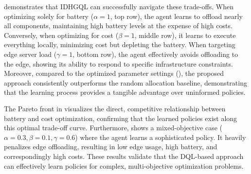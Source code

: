  demonstrates that IDHGQL can successfully navigate these trade-offs. 
When optimizing solely for battery ($\alpha=1$, top row), 
 the agent learns to offload nearly all components, 
 maintaining high battery levels at the expense of high costs. 
%
Conversely, 
 when optimizing for cost ($\beta=1$, middle row), 
 it learns to execute everything locally, minimizing cost but depleting the battery. 
%
When targeting edge server load ($\gamma=1$, bottom row), 
 the agent effectively avoids offloading to the edge, 
 showing its ability to respond to specific infrastructure constraints.
%
Moreover, 
 compared to the optimized parameter settings (), 
 the proposed approach consistently outperforms the random allocation baseline, 
 demonstrating that the learning process provides a tangible advantage over uninformed policies.


The Pareto front in  visualizes the direct, 
 competitive relationship between battery and cost optimization, 
 confirming that the learned policies exist along this optimal trade-off curve. 
% 
Furthermore,  
 shows a mixed-objective case ($\alpha=0.3, \beta=0.1, \gamma=0.6$) where the agent learns a sophisticated policy. 
 It heavily penalizes edge offloading, resulting in low edge usage, high battery, 
 and correspondingly high costs. 
 These results validate that the DQL-based approach can effectively learn policies for complex, multi-objective optimization problems.


